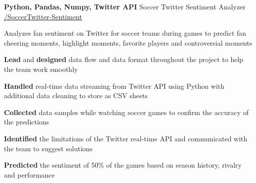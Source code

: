 
\begin{cventries}
    


  \cventry
    {\textbf{Python, Pandas, Numpy, Twitter API}} %
    {Soccer Twitter Sentiment Analyzer} %
    {\href{https://github.com/basulaib/SoccerTwitter-Sentiment}{\faGithub /SoccerTwitter-Sentiment}} %
    {} %
    {
      \begin{cvitems} %
        \item {Analyzes fan sentiment on Twitter for soccer teams during games to predict fan cheering moments, highlight moments, favorite players and controversial moments}
        \item {\textbf{Lead} and \textbf{designed} data flow and data format throughout the project to help the team work smoothly}
        \item {\textbf{Handled} real-time data streaming from Twitter API using Python with additional data cleaning to store as CSV sheets}
        \item {\textbf{Collected} data samples while watching soccer games to confirm the accuracy of the predictions}
        \item {\textbf{Identified} the limitations of the Twitter real-time API and communicated with the team to suggest solutions}
        \item {\textbf{Predicted} the sentiment of 50\% of the games based on season history, rivalry and performance}
      \end{cvitems}
    }
    


\end{cventries}
